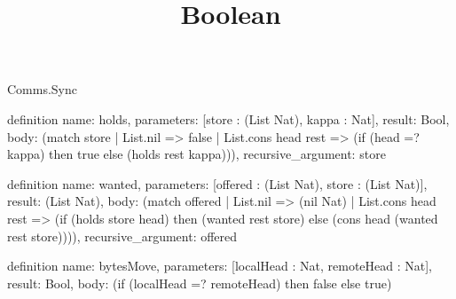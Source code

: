 \begin{lexlean}{Comms.Sync}
\title{Boolean}
\begin{semanticmodule}
definition{
  name: holds,
  parameters: [store : (List Nat), kappa : Nat],
  result: Bool,
  body: (match store
    | List.nil => false
    | List.cons head rest => (if (head =? kappa) then true else (holds rest kappa))),
  recursive_argument: store
}

definition{
  name: wanted,
  parameters: [offered : (List Nat), store : (List Nat)],
  result: (List Nat),
  body: (match offered
    | List.nil => (nil Nat)
    | List.cons head rest => (if (holds store head) then (wanted rest store) else (cons head (wanted rest store)))),
  recursive_argument: offered
}

definition{
  name: bytesMove,
  parameters: [localHead : Nat, remoteHead : Nat],
  result: Bool,
  body: (if (localHead =? remoteHead) then false else true)
}
\end{semanticmodule}
\end{lexlean}
